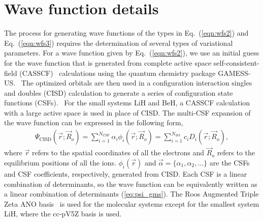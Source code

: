 \documentclass[aip,jcp,numerical,reprint]{revtex4-1}
\begin{document}
\section{ Wave function details}
The process for generating wave functions of the types in Eq.~(\ref{eqn:wfs2}) and Eq.~(\ref{eqn:wfs3}) requires the determination of several types of variational parameters.  For a wave function given by Eq.~(\ref{eqn:wfs2}), we use an initial guess for the wave function that is generated from complete active space self-consistent-field (CASSCF)~\cite{Chaban_MCSCF,Szabo} calculations using the quantum chemistry package GAMESS-US.~\cite{GAMESS} The optimized orbitals are then used in a configuration interaction singles and doubles (CISD) calculation to generate a series of configuration state functions (CSFs).~\cite{Pauncz_CSF} For the small systems LiH and BeH, a CASSCF calculation with a large active space is used in place of CISD. The multi-CSF expansion of the wave function can be expressed in the following form,
\begin{align}
\Psi_{\text{CISD}}(\vec{r};\vec{R}_o)=\sum\limits_{i=1}^{N_{\text{CSF}}}\alpha_i\phi_i(\vec{r};\vec{R}_o) =\sum\limits_{i=1}^{N_{\text{det} } }c_iD_i(\vec{r};\vec{R}_o), \label{eq:psi_gms}
\end{align}
where $\vec{r}$ refers to the spatial coordinates of all the electrons and $\vec{R}_o$ refers to the equilibrium positions of all the ions. $\phi_i(\vec{r})$ and $\vec{\alpha}=\{\alpha_1,\alpha_2,\dots\}$ are the CSFs and CSF coefficients, respectively, generated from CISD. Each CSF is a linear combination of determinants, so the wave function can be equivalently written as a linear combination of determinants (\ref{eq:psi_gms}). The Roos Augmented Triple Zeta ANO basis~\cite{roos} is used for the molecular systems except for the smallest system LiH, where the cc-pV5Z basis is used.
\end{document}
